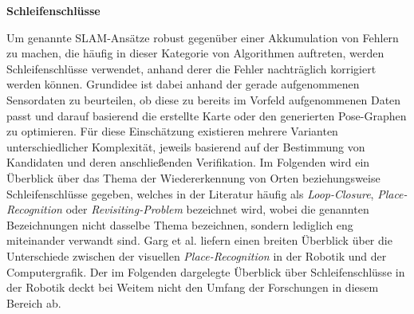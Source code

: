 











\textbf{Schleifenschlüsse}

Um genannte SLAM-Ansätze robust gegenüber einer Akkumulation von Fehlern zu machen, die häufig in dieser Kategorie von Algorithmen auftreten, werden Schleifenschlüsse verwendet, anhand derer die Fehler nachträglich korrigiert werden können. Grundidee ist dabei anhand der gerade aufgenommenen Sensordaten zu beurteilen, ob diese zu bereits im Vorfeld aufgenommenen Daten passt und darauf basierend die erstellte Karte oder den generierten Pose-Graphen zu optimieren. Für diese Einschätzung existieren mehrere Varianten unterschiedlicher Komplexität, jeweils basierend auf der Bestimmung von Kandidaten und deren anschließenden Verifikation. Im Folgenden wird ein Überblick über das Thema der Wiedererkennung von Orten beziehungsweise Schleifenschlüsse gegeben, welches in der Literatur häufig als \emph{Loop-Closure}, \emph{Place-Recognition} oder \emph{Revisiting-Problem} bezeichnet wird, wobei die genannten Bezeichnungen nicht dasselbe Thema bezeichnen, sondern lediglich eng miteinander verwandt sind. Garg et al. \cite{garg2021your} liefern einen breiten Überblick über die Unterschiede zwischen der visuellen \emph{Place-Recognition} in der Robotik und der Computergrafik. Der im Folgenden dargelegte Überblick über Schleifenschlüsse in der Robotik deckt bei Weitem nicht den Umfang der Forschungen in diesem Bereich ab. 

